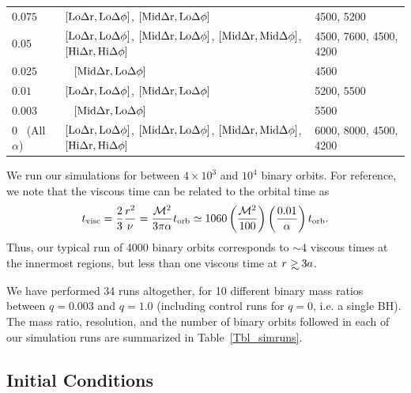 \begin{table}
{\begin{tabular}{   l   |    l   |   l    }
   $0.075$    &   $\left[\rm{Lo}\Delta r, \rm{Lo}\Delta \phi \right]$,  $\left[\rm{Mid}\Delta r, \rm{Lo}\Delta \phi \right]$      &  4500, 5200       \\ 
   $0.05$  &   $\left[\rm{Lo}\Delta r, \rm{Lo}\Delta \phi \right]$,  $\left[\rm{Mid}\Delta r, \rm{Lo}\Delta \phi \right]$,  $\left[\rm{\rm{Mid}\Delta r}, \rm{Mid}\Delta \phi \right]$,    $\left[\rm{\rm{Hi}\Delta r}, \rm{Hi}\Delta \phi \right]$  &  4500, 7600, 4500, 4200     \\ 
   $0.025$   &  \hbox{  } \qquad  \qquad \qquad $\left[\rm{Mid}\Delta r, \rm{Lo}\Delta \phi \right]$     &  4500       \\ 
   $0.01$  &   $\left[\rm{Lo}\Delta r, \rm{Lo}\Delta \phi \right]$,  $\left[\rm{Mid}\Delta r, \rm{Lo}\Delta \phi \right]$      &  5200, 5500     \\
   $0.003$  &     \hbox{  } \qquad  \qquad \qquad   $\left[\rm{Mid}\Delta r, \rm{Lo}\Delta \phi \right]$      &  5500     \\
     $0$ \  (All $\alpha$)  &   $\left[\rm{Lo}\Delta r, \rm{Lo}\Delta \phi \right]$,  $\left[\rm{Mid}\Delta r, \rm{Lo}\Delta \phi \right]$,  $\left[\rm{\rm{Mid}\Delta r}, \rm{Mid}\Delta \phi \right]$,    $\left[\rm{\rm{Hi}\Delta r}, \rm{Hi}\Delta \phi \right]$  & 6000, 8000, 4500, 4200
   \label{runs}
  \end{tabular}
  }
\end{table}

We run our simulations for between $4\times 10^3$ and $10^4$ binary
orbits. For reference, we note that the viscous time can be related
to the orbital time as
%
\begin{equation}
t_{\rm visc} = \frac{2}{3}\frac{r^2}{\nu} =\frac{\mathcal{M}^2}{3 \pi \alpha} t_{\rm orb} \simeq 1060 \left( \frac{\mathcal{M}^2}{100} \right) \left(\frac{0.01}{\alpha} \right) t_{\rm orb}.
\label{tv_torb}
\end{equation}
%
Thus, our typical run of 4000 binary orbits corresponds to $\sim4$ viscous
times at the innermost regions, but less than one viscous time at
$r\gsim3a$.

We have performed 34 runs altogether, for 10 different binary mass
ratios between $q=0.003$ and $q=1.0$ (including control runs for
$q=0$, i.e. a single BH). The mass ratio, resolution, and the number
of binary orbits followed in each of our simulation runs are
summarized in Table~\ref{Tbl_simruns}.

\subsection{Initial Conditions}
\label{Initial Conditions}

